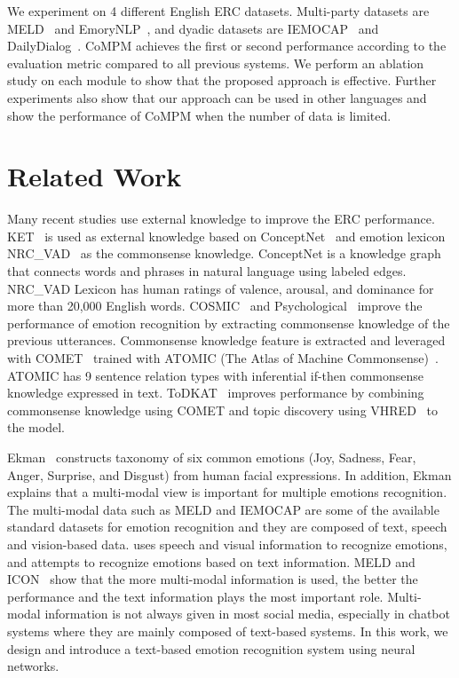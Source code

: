 \documentclass[11pt]{article}
\begin{document}
We experiment on 4 different English ERC datasets. Multi-party datasets are MELD~\cite{poria-etal-2019-meld} and EmoryNLP~\cite{emorynlp}, and dyadic datasets are IEMOCAP~\cite{iemocap} and DailyDialog~\cite{dailydialog}. CoMPM achieves the first or second performance according to the evaluation metric compared to all previous systems. We perform an ablation study on each module to show that the proposed approach is effective. Further experiments also show that our approach can be used in other languages and show the performance of CoMPM when the number of data is limited.


\section{Related Work}
Many recent studies use external knowledge to improve the ERC performance. KET~\cite{zhong-etal-2019-knowledge} is used as external knowledge based on ConceptNet~\cite{conceptnet} and emotion lexicon NRC\_VAD~\cite{mohammad-2018-obtaining} as the commonsense knowledge. ConceptNet is a knowledge graph that connects words and phrases in natural language using labeled edges. NRC\_VAD Lexicon has human ratings of valence, arousal, and dominance for more than 20,000 English words. COSMIC~\cite{ghosal-etal-2020-cosmic} and Psychological~\cite{li-etal-2021-past-present} improve the performance of emotion recognition by extracting commonsense knowledge of the previous utterances. Commonsense knowledge feature is extracted and leveraged with COMET~\cite{bosselut-etal-2019-comet} trained with ATOMIC (The Atlas of Machine Commonsense)~\cite{ATOMIC}. ATOMIC has 9 sentence relation types with inferential if-then commonsense knowledge expressed in text. ToDKAT~\cite{zhu-etal-2021-topic} improves performance by combining commonsense knowledge using COMET and topic discovery using VHRED~\cite{Serban} to the model. 


Ekman~\cite{Ekman1992AnAF} constructs taxonomy of six common emotions (Joy, Sadness, Fear, Anger, Surprise, and Disgust) from human facial expressions. In addition, Ekman explains that a multi-modal view is important for multiple emotions recognition. The multi-modal data such as MELD and IEMOCAP are some of the available standard datasets for emotion recognition and they are composed of text, speech and vision-based data. \citet{audiovisual} uses speech and visual information to recognize emotions, and \cite{alm-etal-2005-emotions} attempts to recognize emotions based on text information. MELD and ICON~\cite{hazarika-etal-2018-icon} show that the more multi-modal information is used, the better the performance and the text information plays the most important role. Multi-modal information is not always given in most social media, especially in chatbot systems where they are mainly composed of text-based systems. In this work, we design and introduce a text-based emotion recognition system using neural networks.
\end{document}
